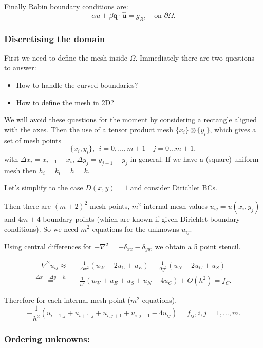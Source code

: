 \documentclass[12pt, a4paper]{article}
\renewcommand{\vec}[1]{\mathbf{#1}}
\theoremstyle{definition}
\theoremstyle{remark}
\numberwithin{equation}{section}
\begin{document}
Finally Robin boundary conditions are:
\begin{equation*}
\alpha u +\beta\vec{q}\cdot \hat{\vec{u}}=g_R, \quad \mbox{on $\partial \Omega$.}
\end{equation*}

\newpage
\subsubsection{Discretising the domain}

First we need to define the mesh inside $\Omega$. 
Immediately there are two questions to answer:
\begin{itemize}
\item How to handle the curved boundaries?
\item How to define the mesh in 2D?
\end{itemize}
We will avoid these questions for the moment  by considering a rectangle aligned with the axes.
Then the use of a tensor product mesh 
$\{x_i\} \otimes \{y_i\}$, which gives a set of mesh points 
\[\{x_i,y_i\},\ \ i=0,\ldots,m+1 \quad j=0\ldots m+1,\]
with  $\Delta x_i=x_{i+1}-x_i$, $\Delta y_j=y_{j+1}-y_j$ in general. 
 If we have a (square) uniform mesh then $h_i=k_i=h=k$.

Let's simplify to the case $D(x,y)=1$ and consider Dirichlet BCs. 

Then there are $(m+2)^2$ mesh points, $m^2$ internal mesh values $u_{ij}=u(x_i,y_j)$ and $4m+4$ boundary points (which are known if given Dirichlet boundary conditions).
So we need $m^2$ equations for the unknowns $u_{ij}$.

Using central differences for $-\nabla^2=-\delta_{xx}-\delta_{yy}$, we obtain a 5 point stencil.


\begin{align*}
-\nabla^2u_{ij} \approx& -\frac{1}{\Delta x^2}(u_W-2u_C+u_E)-\frac{1}{\Delta y^2}(u_N-2u_C+u_S)\\
\stackrel{\Delta x=\Delta y = h}{=}& -\frac{1}{h^2}(u_W+u_E+u_S+u_N-4u_C)+O(h^2)
=f_C.
\end{align*}

Therefore for each internal mesh point ($m^2$ equations).
\begin{equation*}
-\frac{1}{h^2}(u_{i-1,j}+u_{i+1,j}+u_{i,j+1}+u_{i,j-1}-4u_{ij})=f_{ij}, i,j=1,\ldots,m.
\end{equation*}

\newpage

\subsubsection{Ordering unknowns:}
\end{document}
